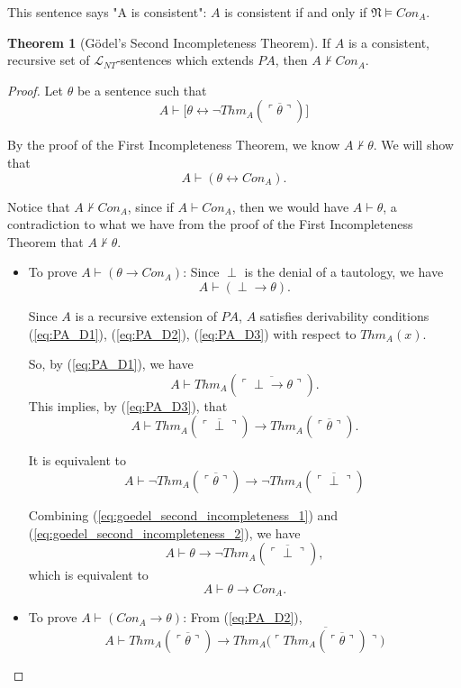\documentclass[11pt,letterpaper]{book}
\theoremstyle{definition}
\newtheorem{theorem}{Theorem}[section]
\begin{document}
This sentence says "A is consistent": $A$ is consistent if and only if $\mathfrak{N} \models Con_A$.

\begin{theorem}[G\"odel's Second Incompleteness Theorem]
\label{theorem:goedel_second_incompleteness}
If $A$ is a consistent, recursive set of $\mathcal{L}_{NT}$-sentences which extends $PA$, then $A \not \vdash Con_A$.
\end{theorem}

\begin{proof}
Let $\theta$ be a sentence such that
\begin{equation}
A \vdash \bigg[ \theta \leftrightarrow \lnot Thm_A ( \overline{\ulcorner \theta \urcorner} ) \bigg]
\label{eq:goedel_second_incompleteness_1}
\end{equation}

By the proof of the First Incompleteness Theorem, we know $A \not \vdash \theta$. We will show that
$$ A \vdash (\theta \leftrightarrow Con_{A}) .$$

Notice that $A \not \vdash Con_{A}$, since if $A \vdash Con_{A}$, then we would have $A \vdash \theta$, a contradiction to what we have from the  proof of the First Incompleteness Theorem that $A \not \vdash \theta$.

\begin{itemize}
\item{To prove $A \vdash (\theta \rightarrow Con_{A}) $: Since $\perp$ is the denial of a tautology, we have
$$ A \vdash (\perp \rightarrow \theta) .$$

Since $A$ is a recursive extension of $PA$, $A$ satisfies derivability conditions (\ref{eq:PA_D1}), (\ref{eq:PA_D2}), (\ref{eq:PA_D3}) with respect to $Thm_A (x)$.

So, by (\ref{eq:PA_D1}), we have
$$ A \vdash Thm_A (\overline{\ulcorner \perp \rightarrow \theta \urcorner}) . $$
This implies, by (\ref{eq:PA_D3}), that
$$ A \vdash Thm_A (\overline{\ulcorner \perp \urcorner}) \rightarrow Thm_A (\overline{\ulcorner  \theta \urcorner}) . $$

It is equivalent to 
\begin{equation}
A \vdash \lnot Thm_A (\overline{\ulcorner  \theta \urcorner}) \rightarrow \lnot Thm_A (\overline{\ulcorner \perp \urcorner})
\label{eq:goedel_second_incompleteness_2}
\end{equation}

Combining (\ref{eq:goedel_second_incompleteness_1}) and (\ref{eq:goedel_second_incompleteness_2}), we have
$$ A \vdash \theta \rightarrow \lnot Thm_A (\overline{\ulcorner \perp \urcorner}), $$
which is equivalent to
$$ A \vdash \theta \rightarrow Con_A . $$
}
\item{To prove $A \vdash ( Con_{A}  \rightarrow \theta ) $: From (\ref{eq:PA_D2}),
\begin{equation}
A \vdash Thm_A (\overline{\ulcorner \theta \urcorner}) \rightarrow Thm_A \big( \overline{\ulcorner Thm_A ( \overline{\ulcorner \theta \urcorner} ) \urcorner} \big)
\label{eq:goedel_second_incompleteness_3}
\end{equation}

}
\end{itemize}
\end{proof}
\end{document}
